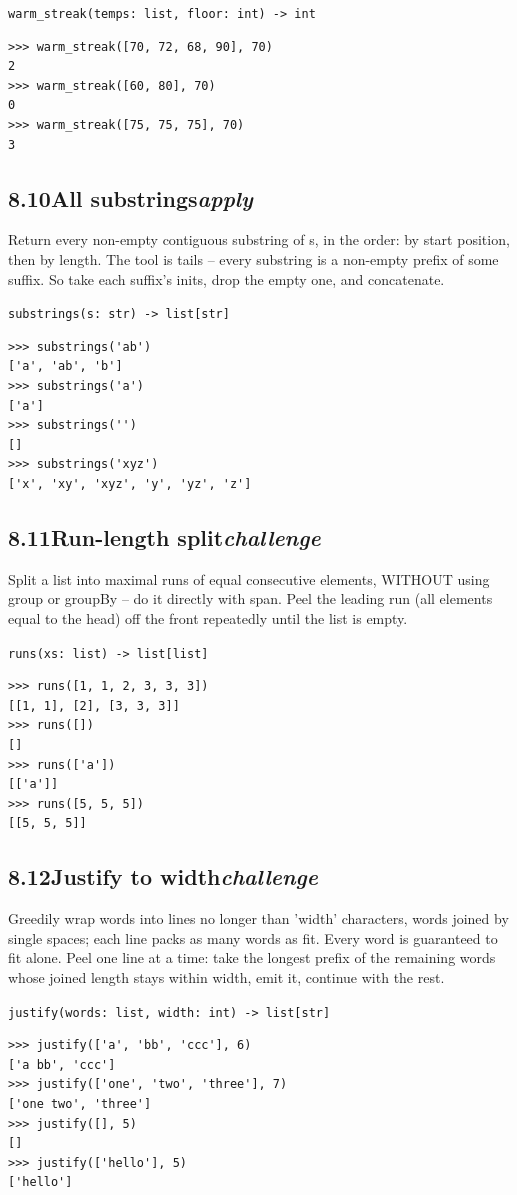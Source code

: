 \documentclass[10pt,letterpaper]{book}
\begin{document}
\noindent\texttt{warm\_streak(temps: list, floor: int) -> int}
\begin{lstlisting}[style=ex]
>>> warm_streak([70, 72, 68, 90], 70)
2
>>> warm_streak([60, 80], 70)
0
>>> warm_streak([75, 75, 75], 70)
3
\end{lstlisting}
\subsection*{8.10\quad All substrings\hfill\textnormal{\textit{apply}}}
Return every non-empty contiguous substring of s, in the order: by start position, then by length. The tool is tails -- every substring is a non-empty prefix of some suffix. So take each suffix's inits, drop the empty one, and concatenate.

\noindent\texttt{substrings(s: str) -> list[str]}
\begin{lstlisting}[style=ex]
>>> substrings('ab')
['a', 'ab', 'b']
>>> substrings('a')
['a']
>>> substrings('')
[]
>>> substrings('xyz')
['x', 'xy', 'xyz', 'y', 'yz', 'z']
\end{lstlisting}
\subsection*{8.11\quad Run-length split\hfill\textnormal{\textit{challenge}}}
Split a list into maximal runs of equal consecutive elements, WITHOUT using group or groupBy -- do it directly with span. Peel the leading run (all elements equal to the head) off the front repeatedly until the list is empty.

\noindent\texttt{runs(xs: list) -> list[list]}
\begin{lstlisting}[style=ex]
>>> runs([1, 1, 2, 3, 3, 3])
[[1, 1], [2], [3, 3, 3]]
>>> runs([])
[]
>>> runs(['a'])
[['a']]
>>> runs([5, 5, 5])
[[5, 5, 5]]
\end{lstlisting}
\subsection*{8.12\quad Justify to width\hfill\textnormal{\textit{challenge}}}
Greedily wrap words into lines no longer than 'width' characters, words joined by single spaces; each line packs as many words as fit. Every word is guaranteed to fit alone. Peel one line at a time: take the longest prefix of the remaining words whose joined length stays within width, emit it, continue with the rest.

\noindent\texttt{justify(words: list, width: int) -> list[str]}
\begin{lstlisting}[style=ex]
>>> justify(['a', 'bb', 'ccc'], 6)
['a bb', 'ccc']
>>> justify(['one', 'two', 'three'], 7)
['one two', 'three']
>>> justify([], 5)
[]
>>> justify(['hello'], 5)
['hello']
\end{lstlisting}
\end{document}
